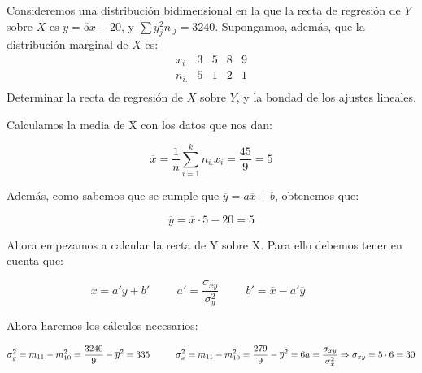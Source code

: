 \problem

Consideremos una distribuci{\'o}n bidimensional en la que la recta de regresi{\'o}n de $Y$ sobre $X$ es
$y=5x-20$, y $\sum y_{j}^{2} n_{.j} =3240$. Supongamos, adem{\'a}s, que la distribuci{\'o}n marginal de $X$
es:
   $$ \begin{array}{c|cccc}
       x_i   &  3 & 5 & 8 & 9 \\ \hline
        n_{i.} &  5 & 1 & 2 & 1 \\
    \end{array}$$
Determinar la recta de regresi{\'o}n de $X$ sobre $Y$, y la bondad  de los ajustes lineales.

\subproblem
Calculamos la media de X con los datos que nos dan:

\begin{equation*}
    \overline{x} = \dfrac{1}{n} \sum_{i=1}^k n_{i.} x_i = \dfrac{45}{9} = 5
\end{equation*}

Además, como sabemos que se cumple que $\overline{y} = a \overline{x} + b$, obtenemos que:

\begin{equation*}
    \overline{y} = \overline{x} \cdot 5 - 20 = 5
\end{equation*}

Ahora empezamos a calcular la recta de Y sobre X. Para ello debemos tener en cuenta que:

\begin{equation*}
    x = a'y + b'
    \hspace{1cm}
    a' = \dfrac{\sigma_{xy}}{\sigma_y^2}
    \hspace{1cm}
    b' = \overline{x} - a' \overline{y}
    \hspace{1cm}
\end{equation*}

Ahora haremos los cálculos necesarios:

\begin{center}
    \begin{equation*}
            \sigma_{y}^2 = m_{11} - m_{10}^2 = \dfrac{3240}{9} - \overline{y}^2 = 335
            \hspace{1cm}
            \sigma_{x}^2 = m_{11} - m_{10}^2 = \dfrac{279}{9} - \overline{y}^2 = 6\\
            
            a = \dfrac{\sigma_{xy}}{\sigma_x^2} \Rightarrow \sigma_{xy} = 5 \cdot 6 = 30
    \end{equation*}
\end{center}

